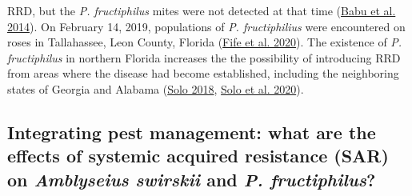 \documentclass[12pt,final,CPage]{ufthesis}
\begin{document}
{RRD, but the \emph{P. fructiphilus} mites were not detected at that time (\protect\hyperlink{ref-Babu2014}{Babu et al. 2014}). On February 14, 2019, populations of \emph{P. fructiphilius} were encountered on roses in Tallahassee, Leon County, Florida (\protect\hyperlink{ref-Fife2020}{Fife et al. 2020}). The existence of \emph{P. fructiphilus} in northern Florida increases the the possibility of introducing RRD from areas where the disease had become established, including the neighboring states of Georgia and Alabama (\protect\hyperlink{ref-Solo2018}{Solo 2018}, \protect\hyperlink{ref-Solo2020}{Solo et al. 2020}).

  \hypertarget{intro-asm-ipm}{%
  \subsection{\texorpdfstring{Integrating pest management: what are the effects of systemic acquired resistance (SAR) on \emph{Amblyseius swirskii} and \emph{P. fructiphilus}?}{Integrating pest management: what are the effects of systemic acquired resistance (SAR) on Amblyseius swirskii and P. fructiphilus?}}\label{intro-asm-ipm}}

}
\end{document}
